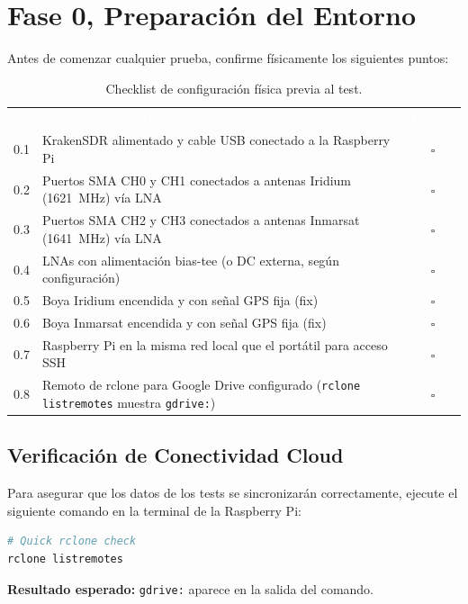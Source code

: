 \section{Fase 0, Preparación del Entorno}

Antes de comenzar cualquier prueba, confirme físicamente los siguientes puntos:

\begin{table}[h]
    \centering
    \renewcommand{\arraystretch}{1.5} %
    \begin{tabularx}{\textwidth}{l X c}
        \rowcolor{deyposcolor} 
        \textbf{\textcolor{white}{\#}} & 
        \textbf{\textcolor{white}{Elemento de Verificación}} & 
        \textbf{\textcolor{white}{Estado}} \\ 
        
        0.1 & KrakenSDR alimentado y cable USB conectado a la Raspberry Pi & $\square$ \\
        \rowcolor[gray]{0.95} %
        0.2 & Puertos SMA CH0 y CH1 conectados a antenas Iridium (1621~MHz) vía LNA & $\square$ \\
        0.3 & Puertos SMA CH2 y CH3 conectados a antenas Inmarsat (1641~MHz) vía LNA & $\square$ \\
        \rowcolor[gray]{0.95}
        0.4 & LNAs con alimentación bias-tee (o DC externa, según configuración) & $\square$ \\
        0.5 & Boya Iridium encendida y con señal GPS fija (fix) & $\square$ \\
        \rowcolor[gray]{0.95}
        0.6 & Boya Inmarsat encendida y con señal GPS fija (fix) & $\square$ \\
        0.7 & Raspberry Pi en la misma red local que el portátil para acceso SSH & $\square$ \\
        \rowcolor[gray]{0.95}
        0.8 & Remoto de rclone para Google Drive configurado (\texttt{rclone listremotes} muestra \texttt{gdrive:}) & $\square$ \\
        \bottomrule
    \end{tabularx}
    \caption{Checklist de configuración física previa al test.}
    \label{tab:pre_test_checklist}
\end{table}

\subsection{Verificación de Conectividad Cloud}

Para asegurar que los datos de los tests se sincronizarán correctamente, ejecute el siguiente comando en la terminal de la Raspberry Pi:

\begin{lstlisting}[language=bash, title=Verificación de configuración rclone]
# Quick rclone check
rclone listremotes
\end{lstlisting}
\noindent \small \textbf{Resultado esperado:} \texttt{gdrive:} aparece en la salida del comando.